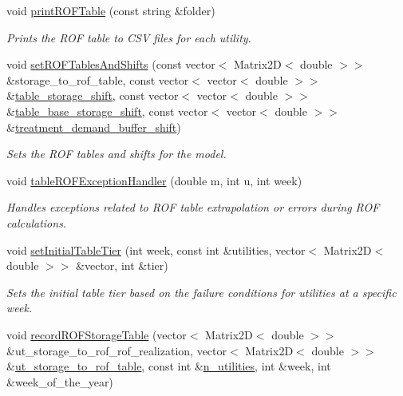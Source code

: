 \begin{DoxyCompactItemize}
void \mbox{\hyperlink{classContinuityModelROF_a1bb8362ce39e694937a787805613e106}{print\+R\+O\+F\+Table}} (const string \&folder)
\begin{DoxyCompactList}\small\item\em Prints the R\+OF table to C\+SV files for each utility. \end{DoxyCompactList}\item 
void \mbox{\hyperlink{classContinuityModelROF_a83fc5e19e0f92d12d659c3446b90fa13}{set\+R\+O\+F\+Tables\+And\+Shifts}} (const vector$<$ Matrix2D$<$ double $>$$>$ \&storage\+\_\+to\+\_\+rof\+\_\+table, const vector$<$ vector$<$ double $>$$>$ \&\mbox{\hyperlink{classContinuityModelROF_a1a90c8816944aab36f395e89f7b84c06}{table\+\_\+storage\+\_\+shift}}, const vector$<$ vector$<$ double $>$$>$ \&\mbox{\hyperlink{classContinuityModelROF_a2bc5728653819a0d54a36ffbb1df44a3}{table\+\_\+base\+\_\+storage\+\_\+shift}}, const vector$<$ vector$<$ double $>$$>$ \&\mbox{\hyperlink{classContinuityModelROF_aedb1313e889617d718d2a93d719cb3f1}{treatment\+\_\+demand\+\_\+buffer\+\_\+shift}})
\begin{DoxyCompactList}\small\item\em Sets the R\+OF tables and shifts for the model. \end{DoxyCompactList}\item 
void \mbox{\hyperlink{classContinuityModelROF_a10a8a95f3177d305d3881e654f01d65d}{table\+R\+O\+F\+Exception\+Handler}} (double m, int u, int week)
\begin{DoxyCompactList}\small\item\em Handles exceptions related to R\+OF table extrapolation or errors during R\+OF calculations. \end{DoxyCompactList}\item 
void \mbox{\hyperlink{classContinuityModelROF_a0c46d5905f5d0ae2cf0abd0d4653bbc7}{set\+Initial\+Table\+Tier}} (int week, const int \&utilities, vector$<$ Matrix2D$<$ double $>$$>$ \&vector, int \&tier)
\begin{DoxyCompactList}\small\item\em Sets the initial table tier based on the failure conditions for utilities at a specific week. \end{DoxyCompactList}\item 
void \mbox{\hyperlink{classContinuityModelROF_aa2348a2a5dea751462771ef538243e75}{record\+R\+O\+F\+Storage\+Table}} (vector$<$ Matrix2D$<$ double $>$$>$ \&ut\+\_\+storage\+\_\+to\+\_\+rof\+\_\+rof\+\_\+realization, vector$<$ Matrix2D$<$ double $>$$>$ \&\mbox{\hyperlink{classContinuityModelROF_ada25d241caf860255ad00097f5e7adb6}{ut\+\_\+storage\+\_\+to\+\_\+rof\+\_\+table}}, const int \&\mbox{\hyperlink{classContinuityModel_a6df6198ebc99a099df08f4b8ce6b52b9}{n\+\_\+utilities}}, int \&week, int \&week\+\_\+of\+\_\+the\+\_\+year)
$$
\end{DoxyCompactItemize}
